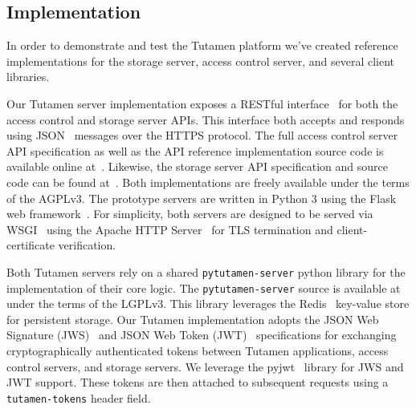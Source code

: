 \subsection{Implementation}

In order to demonstrate and test the Tutamen platform we've created
reference implementations for the storage server, access control
server, and several client libraries.

Our Tutamen server implementation exposes a RESTful
interface~\cite{fielding2000} for both the access control and storage
server APIs. This interface both accepts and responds using
JSON~\cite{json} messages over the HTTPS protocol. The full access
control server API specification as well as the API reference
implementation source code is available online
at~\cite{src-tutamen-apiaccesscontrol}. Likewise, the storage server
API specification and source code can be found
at~\cite{src-tutamen-apistorage}. Both implementations are freely
available under the terms of the AGPLv3. The prototype servers are
written in Python 3 using the Flask web
framework~\cite{python-flask}. For simplicity, both servers are
designed to be served via WSGI~\cite{pep3333} using the Apache HTTP
Server~\cite{apache} for TLS termination and client-certificate
verification.

Both Tutamen servers rely on a shared \texttt{pytutamen-server} python
library for the implementation of their core logic. The
\texttt{pytutamen-server} source is available
at~\cite{src-tutamen-pytutamenserver} under the terms of the
LGPLv3. This library leverages the Redis~\cite{redis} key-value store
for persistent storage. Our Tutamen implementation adopts the JSON Web
Signature (JWS)~\cite{rfc7515} and JSON Web Token (JWT)~\cite{rfc7519}
specifications for exchanging cryptographically authenticated tokens
between Tutamen applications, access control servers, and storage
servers. We leverage the pyjwt~\cite{pyjwt} library for JWS and JWT
support. These tokens are then attached to subsequent requests using a
\texttt{tutamen-tokens} header field.

